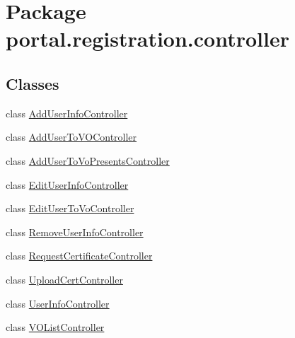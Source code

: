 \hypertarget{namespaceportal_1_1registration_1_1controller}{
\section{Package portal.registration.controller}
\label{namespaceportal_1_1registration_1_1controller}
}
\subsection*{Classes}
\begin{DoxyCompactItemize}
\item 
class \hyperlink{classportal_1_1registration_1_1controller_1_1AddUserInfoController}{AddUserInfoController}
\item 
class \hyperlink{classportal_1_1registration_1_1controller_1_1AddUserToVOController}{AddUserToVOController}
\item 
class \hyperlink{classportal_1_1registration_1_1controller_1_1AddUserToVoPresentsController}{AddUserToVoPresentsController}
\item 
class \hyperlink{classportal_1_1registration_1_1controller_1_1EditUserInfoController}{EditUserInfoController}
\item 
class \hyperlink{classportal_1_1registration_1_1controller_1_1EditUserToVoController}{EditUserToVoController}
\item 
class \hyperlink{classportal_1_1registration_1_1controller_1_1RemoveUserInfoController}{RemoveUserInfoController}
\item 
class \hyperlink{classportal_1_1registration_1_1controller_1_1RequestCertificateController}{RequestCertificateController}
\item 
class \hyperlink{classportal_1_1registration_1_1controller_1_1UploadCertController}{UploadCertController}
\item 
class \hyperlink{classportal_1_1registration_1_1controller_1_1UserInfoController}{UserInfoController}
\item 
class \hyperlink{classportal_1_1registration_1_1controller_1_1VOListController}{VOListController}
\end{DoxyCompactItemize}
